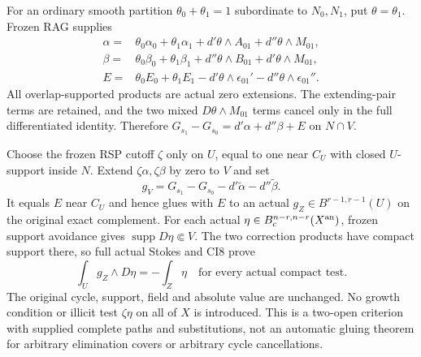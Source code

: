 For an ordinary smooth partition $\theta_0+\theta_1=1$ subordinate
to $N_0,N_1$, put $\theta=\theta_1$.  Frozen RAG supplies
\[
\begin{split}
 \alpha={}&\theta_0\alpha_0+\theta_1\alpha_1
                     +d'\theta\wedge A_{01}+d''\theta\wedge M_{01},\\
 \beta={}&\theta_0\beta_0+\theta_1\beta_1
                     +d''\theta\wedge B_{01}+d'\theta\wedge M_{01},\\
 E={}&\theta_0E_0+\theta_1E_1
          -d'\theta\wedge\epsilon_{01}'-d''\theta\wedge\epsilon_{01}''.
\end{split}
\tag{GPR43}
\]
All overlap-supported products are actual zero extensions.  The
extending-pair terms are retained, and the two mixed
$D\theta\wedge M_{01}$ terms cancel only in the full
differentiated identity.  Therefore
$G_{s_1}-G_{s_0}=d'\alpha+d''\beta+E$ on $N\cap V$.

Choose the frozen RSP cutoff $\zeta$ only on $U$, equal to one
near $C_U$ with closed $U$-support inside $N$.  Extend
$\zeta\alpha,\zeta\beta$ by zero to $V$ and set
\[
          g_V=G_{s_1}-G_{s_0}-d'\widetilde\alpha-d''\widetilde\beta.
 \tag{GPR44}
\]
It equals $E$ near $C_U$ and hence glues with $E$ to an actual
$g_Z\in B^{r-1,r-1}(U)$ on the original exact complement.
For each actual $\eta\in B_c^{n-r,n-r}(X^{\rm an})$, frozen
support avoidance gives $\operatorname{supp}D\eta\Subset V$.
The two correction products have compact support there, so full
actual Stokes and CI8 prove
\[
                         \int_Ug_Z\wedge D\eta=-\int_Z\eta
                       \quad\text{for every actual compact test}.
 \tag{GPR45}
\]
The original cycle, support, field and absolute value are unchanged.
No growth condition or illicit test $\zeta\eta$ on all of $X$ is
introduced.  This is a two-open criterion with supplied complete
paths and substitutions, not an automatic gluing theorem for
arbitrary elimination covers or arbitrary cycle cancellations.

